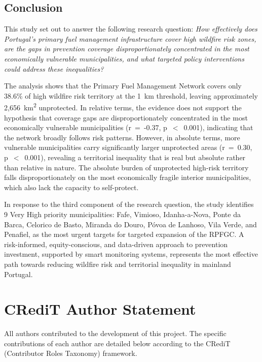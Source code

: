 \subsection{Conclusion}


This study set out to answer the following research question:
\textit{How effectively does Portugal's primary fuel management
infrastructure cover high wildfire risk zones, are the gaps in
prevention coverage disproportionately concentrated in the most
economically vulnerable municipalities, and what targeted policy
interventions could address these inequalities?}

The analysis shows that the Primary Fuel Management Network covers
only 38.6\% of high wildfire risk territory at the 1~km threshold,
leaving approximately 2,656~km\textsuperscript{2} unprotected. In
relative terms, the evidence does not support the hypothesis that
coverage gaps are disproportionately concentrated in the most
economically vulnerable municipalities (r~=~-0.37, p~$<$~0.001),
indicating that the network broadly follows risk patterns. However,
in absolute terms, more vulnerable municipalities carry significantly
larger unprotected areas (r~=~0.30, p~$<$~0.001), revealing a
territorial inequality that is real but absolute rather than relative
in nature. The absolute burden of unprotected high-risk territory
falls disproportionately on the most economically fragile interior
municipalities, which also lack the capacity to self-protect.

In response to the third component of the research question, the
study identifies 9 Very High priority municipalities: Fafe,
Vimioso, Idanha-a-Nova, Ponte da Barca, Celorico de Basto, Miranda
do Douro, Póvoa de Lanhoso, Vila Verde, and Penafiel, as the
most urgent targets for targeted expansion of the RPFGC. A
risk-informed, equity-conscious, and data-driven approach to
prevention investment, supported by smart monitoring systems,
represents the most effective path towards reducing wildfire risk
and territorial inequality in mainland Portugal.


\newpage

\section*{CRediT Author Statement}
All authors contributed to the development of this project.
The specific contributions of each author are detailed below
according to the CRediT (Contributor Roles Taxonomy) framework.\\

